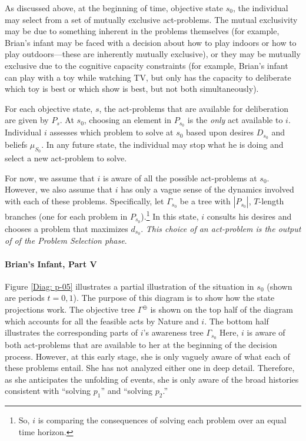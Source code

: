 \documentclass[
11pt,
titlepage,
reqno,
]{article}%
\theoremstyle{definition}
\begin{document}
As discussed above, at the beginning of time, objective state $s_0$, the individual may select from a set of mutually exclusive act-problems. 
The mutual exclusivity may be due to something inherent in the problems themselves (for example, Brian's infant may be faced with a decision about how to play indoors or how to play outdoors---these are inherently mutually exclusive), or they may be mutually exclusive due to the cognitive capacity constraints (for example, Brian's infant can play with a toy while watching TV, but only has the capacity to deliberate which toy is best or which show is best, but not both simultaneously).

For each objective state, $s$, the act-problems that are available for deliberation are given by $P_s$.
At $s_0$, choosing an element in $P_{s_0}$ is the \textit{only} act available to $i$.
Individual $i$ assesses which problem to solve at $s_0$ based upon desires $D_{s_0}$ and beliefs $\mu_{S_0}$.
In any future state, the individual may stop what he is doing and select a new act-problem to solve.

For now, we assume that $i$ is aware of all the possible act-problems at $s_0$.
However, we also assume that $i$ has only a vague sense of the dynamics involved with each of these problems.
Specifically, let $\Gamma_{s_0}$ be a tree with $|P_{s_0}|$, $T$-length branches (one for each problem in $P_{s_0}$).\footnote
{
	So, $i$ is comparing the consequences of solving each problem over an equal time horizon.
}
In this state, $i$ consults his desires and chooses a problem that maximizes $d_{s_0}$.
\textit{This choice of an act-problem is the output of of the Problem Selection phase}.

\paragraph{Brian's Infant, Part V}
Figure \ref{Diag: p-05} illustrates  a partial illustration of the situation in $s_0$ (shown are periods $t=0,1$).
The purpose of this diagram is to show how the state projections work.
The objective tree $\Gamma^\oplus$ is shown on the top half of the diagram which accounts for all the feasible acts by Nature and $i$.
The bottom half illustrates the corresponding parts of $i$'s awareness tree $\Gamma_{s_0}$
Here, $i$ is aware of both act-problems that are available to her at the beginning of the decision process.
However, at this early stage, she is only vaguely aware of what each of these problems entail.
She has not analyzed either one in deep detail.
Therefore, as she anticipates the unfolding of events, she is only aware of the broad histories consistent with ``solving $p_1$'' and ``solving $p_2$.''
\end{document}
